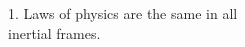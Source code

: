 \documentclass[preview]{standalone}
\begin{document}
\begin{center}
1. Laws of physics are the same in all \\ inertial frames.
\end{center}
\end{document}
